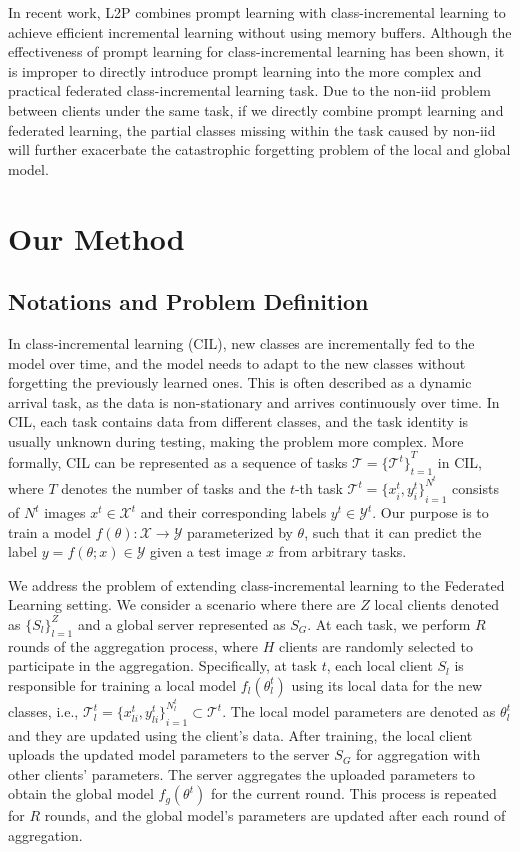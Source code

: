 \documentclass[sigconf,anonymous,review,screen]{acmart}
\begin{document}
In recent work, L2P \cite{wang2022learning} combines prompt learning with class-incremental learning to achieve efficient incremental learning without using memory buffers. Although the effectiveness of prompt learning for class-incremental learning has been shown, it is improper to directly introduce prompt learning into the more complex and practical federated class-incremental learning task. Due to the non-iid problem between clients under the same task, if we directly combine prompt learning and federated learning, the partial classes missing within the task caused by non-iid will further exacerbate the catastrophic forgetting problem of the local and global model. 


\section{Our Method}


\subsection{Notations and Problem Definition}
In class-incremental learning (CIL), new classes are incrementally fed to the model over time, and the model needs to adapt to the new classes without forgetting the previously learned ones. This is often described as a dynamic arrival task, as the data is non-stationary and arrives continuously over time. In CIL, each task contains data from different classes, and the task identity is usually unknown during testing, making the problem more complex. More formally, CIL can be represented as a sequence of tasks $\mathcal{T}={\{ \mathcal{T}^t \}}_{t=1}^T$ in CIL, where $T$ denotes the number of tasks and the $t$-th task $\mathcal{T}^t={\{ x_i^t, y_i^t \}}_{i=1}^{N^t}$ consists of $N^t$ images $x^t \in \mathcal{X}^t$ and their corresponding labels $y^t \in \mathcal{Y}^t$. Our purpose is to train a model $f(\theta) : \mathcal{X} \rightarrow \mathcal{Y}$ parameterized by $\theta$, such that it can predict the label $y=f(\theta; x) \in \mathcal{Y}$ given a test image $x$ from arbitrary tasks.

We address the problem of extending class-incremental learning to the Federated Learning setting. We consider a scenario where there are $Z$ local clients denoted as $\{{ S_l }\}_{l=1}^Z$ and a global server represented as $S_G$. At each task, we perform $R$ rounds of the aggregation process, where $H$ clients are randomly selected to participate in the aggregation. Specifically, at task $t$, each local client $S_l$ is responsible for training a local model $f_l(\theta_l^t)$ using its local data for the new classes, i.e., $\mathcal{T}_l^t={\{ x_{li}^t, y_{li}^t \}}_{i=1}^{N_l^t} \subset $$\mathcal{T}^t$. The local model parameters are denoted as $\theta_l^t$ and they are updated using the client's data. After training, the local client uploads the updated model parameters to the server $S_G$ for aggregation with other clients' parameters. The server aggregates the uploaded parameters to obtain the global model $f_g(\theta^t)$ for the current round. This process is repeated for $R$ rounds, and the global model's parameters are updated after each round of aggregation.
\end{document}
